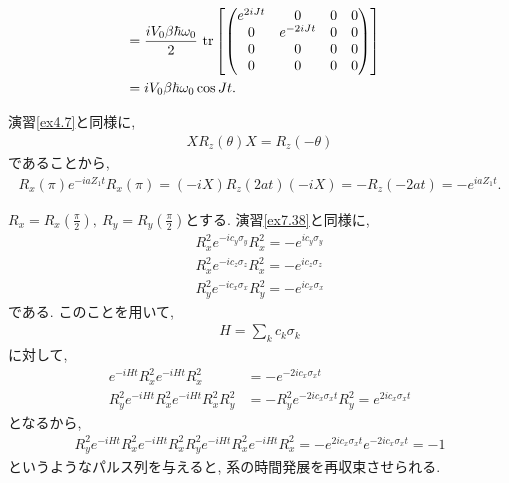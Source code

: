 \begin{ex}
\begin{align*}
        \\
         & =   \frac{i V_0 \beta \hbar \omega_0}{2} \ \mathrm{tr}
        \left[
            \begin{pmatrix}
                e^{2i Jt} & 0         & 0 & 0 \\
                0         & e^{-2iJt} & 0 & 0 \\
                0         & 0         & 0 & 0 \\
                0         & 0         & 0 & 0
            \end{pmatrix}
            \right]
        \\
         & = i V_0 \beta \hbar \omega_0 \cos Jt.
    \end{align*}

\end{ex}

\begin{ex}
    \label{ex7.38}
    演習\ref{ex4.7}と同様に,
    \begin{align*}
        X R_z(\theta) X = R_z(-\theta)
    \end{align*}
    であることから,
    \begin{align*}
        R_x(\pi) e^{- i a Z_1 t} R_x(\pi)
        =
        (-iX)  R_z(2at) (-iX)
        =
        - R_z(-2at)
        =
        - e^{i a Z_1 t}.
    \end{align*}
\end{ex}

\begin{ex}
    \label{ex7.39}
    $R_x = R_x\left( \frac{\pi}{2}\right), \ R_y = R_y\left( \frac{\pi}{2}\right)$とする.
    演習\ref{ex7.38}と同様に,
    \begin{align*}
        R_x^2 e^{- i c_y \sigma_y} R_x^2 =  -e^{i c_y  \sigma_y} \\
        R_x^2 e^{- i c_z \sigma_z} R_x^2 =  -e^{i c_z  \sigma_z} \\
        R_y^2 e^{- i c_x \sigma_x} R_y^2 = -e^{i c_x \sigma_x}
    \end{align*}
    である. このことを用いて,
    \begin{align*}
        H = \sum_k c_k \sigma_k
    \end{align*}
    に対して,
    \begin{align*}
        e^{-iHt} R_x^2 e^{-iHt} R_x^2             & =  -e^{-2ic_x \sigma_x t}                                   \\
        R_y^2 e^{-iHt} R_x^2 e^{-iHt} R_x^2 R_y^2 & = - R_y^2 e^{-2ic_x \sigma_x t} R_y^2 =e^{2ic_x \sigma_x t}
    \end{align*}
    となるから,
    \begin{align*}
        R_y^2 e^{-iHt} R_x^2 e^{-iHt} R_x^2 R_y^2 e^{-iHt} R_x^2 e^{-iHt} R_x^2
        = -e^{2ic_x \sigma_x t} e^{-2ic_x \sigma_x t}
        =-1
    \end{align*}
    というようなパルス列を与えると, 系の時間発展を再収束させられる.
\end{ex}

